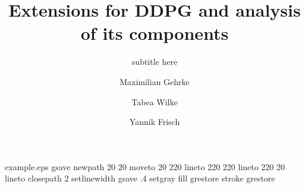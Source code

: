 %
%
%
%
%
\begin{filecontents*}{example.eps}
gsave
newpath
  20 20 moveto
  20 220 lineto
  220 220 lineto
  220 20 lineto
closepath
2 setlinewidth
gsave
  .4 setgray fill
grestore
stroke
grestore
\end{filecontents*}
%
\RequirePackage{fix-cm}
%
\documentclass[smallextended]{svjour3}       %
%
\smartqed  %
%
\usepackage{graphicx}
\usepackage{amsmath}
\usepackage{verbatim}
%
%
%
%
%


\title{Extensions for DDPG and analysis of its components
}
\subtitle{subtitle here}


\author{Maximilian Gehrke \and Tabea Wilke \and Yannik Frisch %
}



